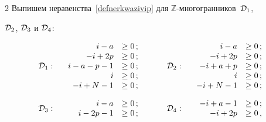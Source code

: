 \begin{multicols}{2}
Выпишем неравенства~\eqref{defnerkwazivip} для $\mathbb{Z}$-мно\-го\-гран\-ни\-ков~${\cal D}_1$, 

${\cal D}_2$, ${\cal D}_3$ и ${\cal D}_4$: 

\begin{alignat*}{4}

{\cal D}_1:\ &&

\begin{array}{rl}

i-a &\geq 0\,;\\

-i+2p &\geq 0\,;\\

i-a-p-1 &\geq 0\,;\\

i &\geq 0\,;\\

-i+N-1 &\geq 0\,;

\end{array}\qquad

&&

{\cal D}_2:\ &&

\begin{array}{rl}

i-a &\geq 0\,;\\

-i+2p &\geq 0\,;\\

-i+a+p&\geq 0\,;\\

i &\geq 0\,;\\

-i+N-1 &\geq 0\,;

\end{array}

\\[6pt]

{\cal D}_3:\ &&

\begin{array}{rl}

i-a &\geq 0\,;\\

i-2p-1 &\geq 0\,;

\end{array}  \qquad

&&

{\cal D}_4:\ &&

\begin{array}{rl}

-i+a-1 &\geq 0\,;\\

-i+2p &\geq 0\,,


\end{array}
\end{alignat*}
\end{multicols}
